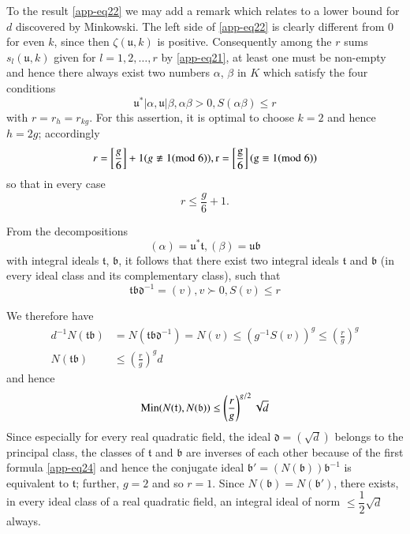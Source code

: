To the result \eqref{app-eq22} we may add a remark which relates to a
lower bound for $d$ discovered by Minkowski. The left side of
\eqref{app-eq22} is clearly different from $0$ for even $k$, since
then $\zeta(\mathfrak{u},k)$ is positive. Consequently among the $r$
sums $s_{l}(\mathfrak{u},k)$ given for $l=1,2,\ldots,r$ by
\eqref{app-eq21}, at least one must be non-empty and hence there
always exist two numbers $\alpha$, $\beta$ in $K$ which satisfy the
four conditions
$$
\mathfrak{u}^{\ast}|\alpha,\mathfrak{u}|\beta,\alpha\beta>0,S(\alpha\beta)\leq
r
$$\pageoriginale
with $r=r_{h}=r_{kg}$. For this assertion, it is optimal to choose
$k=2$ and hence $h=2g$; accordingly
$$
r=\left[\frac{g}{6}\right]+1(g\not\equiv 1(\rm{mod} \;  6)),
r=\left[\frac{g}{6}\right](g\equiv 1(\rm{mod} \;  6))
$$
so that in every case
\begin{equation*}
r\leq \frac{g}{6}+1.\tag{23}\label{app-eq23}
\end{equation*}

From the decompositions
$$
(\alpha)=\mathfrak{u}^{\ast}\mathfrak{t},(\beta)=\mathfrak{ub}
$$
with integral ideals $\mathfrak{t}$, $\mathfrak{b}$, it follows that
there exist two integral ideals $\mathfrak{t}$ and $\mathfrak{b}$ (in
every ideal class and its complementary class), such that 
\begin{equation*}
\mathfrak{tbd}^{-1}=(v),v \succ 0,S(v)\leq r\tag{24}\label{app-eq24}
\end{equation*}

We therefore have
\begin{equation*}
\begin{split}
d^{-1}N(\mathfrak{tb}) &= N(\mathfrak{tbd}^{-1})=N(v)\leq
(g^{-1}S(v))^{g}\leq \left(\frac{r}{g}\right)^{g}\\
N(\mathfrak{tb}) &\leq \left(\frac{r}{g}\right)^{g}d
\end{split}\tag{25}\label{app-eq25}
\end{equation*}
and hence
$$
\operatorname{Min} (N(\mathfrak{t}), N(\mathfrak{b}))\leq
\left(\frac{r}{g}\right)^{g/2}\sqrt{d}
$$
Since especially for every real quadratic field, the ideal
$\mathfrak{d}=(\sqrt{d})$ belongs to the principal class, the classes
of $\mathfrak{t}$ and $\mathfrak{b}$ are inverses of each other
because of the first formula \eqref{app-eq24} and hence the conjugate
ideal $\mathfrak{b}'=(N(\mathfrak{b}))\mathfrak{b}^{-1}$ is equivalent
to $\mathfrak{t}$; further, $g=2$ and so $r=1$. Since
$N(\mathfrak{b})=N(\mathfrak{b}')$, there exists, in every ideal class
of a real quadratic field, an integral ideal of norm $\leq
\dfrac{1}{2}\sqrt{d}$ always.

